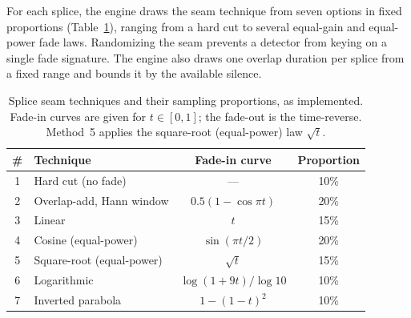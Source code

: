 \documentclass[11pt]{report}
\begin{document}
For each splice, the engine draws the seam technique from
seven options in fixed proportions (Table~\ref{tab:splice}), ranging from
a hard cut to several equal-gain and equal-power fade laws. Randomizing
the seam prevents a detector from keying on a single fade signature. The
engine also draws one overlap duration per splice from a fixed range and
bounds it by the available silence.

\begin{table}[H]
\centering
\caption{Splice seam techniques and their sampling
proportions, as implemented. Fade-in curves are given for
$t\in[0,1]$; the fade-out is the time-reverse. Method~5 applies the
square-root (equal-power) law $\sqrt{t}$.}
\label{tab:splice}
\small
\begin{tabular}{clcc}
\toprule
\textbf{\#} & \textbf{Technique} & \textbf{Fade-in curve} & \textbf{Proportion} \\
\midrule
1 & Hard cut (no fade)          & ---                       & 10\% \\
2 & Overlap-add, Hann window    & $0.5(1-\cos\pi t)$        & 20\% \\
3 & Linear                      & $t$                       & 15\% \\
4 & Cosine (equal-power)        & $\sin(\pi t/2)$           & 20\% \\
5 & Square-root (equal-power)   & $\sqrt{t}$                & 15\% \\
6 & Logarithmic                 & $\log(1+9t)/\log 10$      & 10\% \\
7 & Inverted parabola           & $1-(1-t)^2$               & 10\% \\
\bottomrule
\end{tabular}
\end{table}
\end{document}

